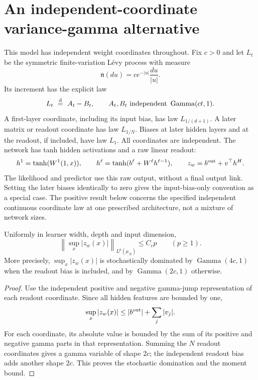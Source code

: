 \section{An independent-coordinate variance-gamma alternative}
\label{sec:raw-variance-gamma}
This model has independent weight coordinates throughout. Fix $c>0$ and let $L_t$ be the symmetric finite-variation L\'evy process with measure
\[
 \mathfrak n(du)=c e^{-|u|}\frac{du}{|u|}.
\]
Its increment has the explicit law
\[
 L_t\ \stackrel{\rm d}=\ A_t-B_t,\qquad
 A_t,B_t\ \hbox{independent }\operatorname{Gamma}(ct,1).
\]
A first-layer coordinate, including its input bias, has law $L_{1/(d+1)}$. A later matrix or readout coordinate has law $L_{1/N}$. Biases at later hidden layers and at the readout, if included, have law $L_1$. All coordinates are independent. The network has tanh hidden activations and a raw linear readout:
\[
 h^1=\tanh(W^1(1,x)),\qquad
 h^\ell=\tanh(b^\ell+W^\ell h^{\ell-1}),\qquad
 z_w=b^{\rm out}+v^\top h^H.
\]
The likelihood and predictor use this raw output, without a final output link. Setting the later biases identically to zero gives the input-bias-only convention as a special case. The positive result below concerns the specified independent continuous coordinate law at one prescribed architecture, not a mixture of network sizes.

\begin{lemma}
\label{lem:VG-raw-moment}
Uniformly in learner width, depth and input dimension,
\[
 \left\|\sup_x|z_w(x)|\right\|_{L^p(\mu_N)}
 \le C_c p\qquad(p\ge1).
\]
More precisely, $\sup_x|z_w(x)|$ is stochastically dominated by
$\operatorname{Gamma}(4c,1)$ when the readout bias is included, and by
$\operatorname{Gamma}(2c,1)$ otherwise.
\end{lemma}
\begin{proof}
Use the independent positive and negative gamma-jump representation of each readout coordinate. Since all hidden features are bounded by one,
\[
 \sup_x|z_w(x)|\le |b^{\rm out}|+\sum_j|v_j|.
\]
For each coordinate, its absolute value is bounded by the sum of its positive and negative gamma parts in that representation. Summing the $N$ readout coordinates gives a gamma variable of shape $2c$; the independent readout bias adds another shape $2c$. This proves the stochastic domination and the moment bound.
\end{proof}

